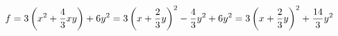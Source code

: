 \documentclass[preview]{standalone}
\begin{document}
\begin{align*}
\special{dvisvgm:raw <g id='unique000'>}f=3\left(x^2+\dfrac{4}{3}xy\right)+6y^2=3\left(x+\dfrac{2}{3}y\right)^2-\dfrac{4}{3}y^2+6y^2=3\left(x+\dfrac{2}{3}y\right)^2+\dfrac{14}{3}y^2\special{dvisvgm:raw </g>}
\end{align*}
\end{document}
